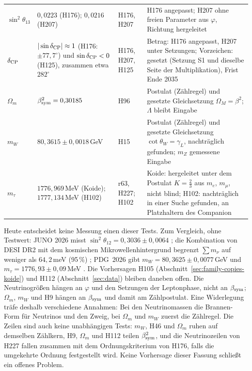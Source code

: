 \begin{center}
\begin{tabular}{@{}p{.17\linewidth}p{.25\linewidth}p{.13\linewidth}p{.35\linewidth}@{}}
\raggedright \(\sin^2\theta_{13}\) & \raggedright \(0{,}0223\) (H176); \(0{,}0216\) (H207) & \raggedright H176, H207 & \raggedright H176 angepasst; H207 ohne freien Parameter aus \(\varphi\), Richtung hergeleitet\tabularnewline
\raggedright \(\delta_{\rm CP}\) & \raggedright \(|\sin\delta_{\rm CP}|\approx1\) (H176: \(\pm77{,}7^\circ\)) und \(\sin\delta_{\rm CP}<0\) (H125), zusammen etwa \(282^\circ\) & \raggedright H176, H207, H125 & \raggedright Betrag: H176 angepasst, H207 unter Setzungen; Vorzeichen: gesetzt (Setzung S1 und dieselbe Seite der Multiplikation), Frist Ende 2035\tabularnewline
\hline
\raggedright \(\Omega_m\) & \raggedright \(\beta_{\rm sym}^2=0{,}30185\) & \raggedright H96 & \raggedright Postulat (Zählregel) und gesetzte Gleichsetzung \(\Omega_M=\beta^2\); \(\Lambda\) bleibt Eingabe\tabularnewline
\raggedright \(m_W\) & \raggedright \(80{,}3615\pm0{,}0018\)\,GeV & \raggedright H15 & \raggedright Postulat (Zählregel) und gesetzte Gleichsetzung \(\cot\theta_W=\gamma_L\), nachträglich gefunden; \(m_Z\) gemessene Eingabe\tabularnewline
\raggedright \(m_\tau\) & \raggedright \(1776{,}969\)\,MeV (Koide); \(1777{,}134\)\,MeV (H102) & \raggedright r63, H227; H102 & \raggedright Koide: hergeleitet unter dem Postulat \(K=\tfrac23\) aus \(m_e\), \(m_\mu\), nicht blind; H102: nachträglich in einer Suche gefunden, an Platzhaltern des Companion\tabularnewline
\hline
\end{tabular}
\end{center}

Heute entscheidet keine Messung einen dieser Tests. Zum Vergleich, ohne Testwert: JUNO 2026 misst \(\sin^2\theta_{12}=0{,}3036\pm0{,}0064\)
\cite{juno2026}; die Kombination von DESI DR2 mit dem kosmischen Mikrowellenhintergrund begrenzt \(\sum m_\nu\) auf weniger als
\(64{,}2\)\,meV (95\,\%) \cite{desi-dr2}; PDG~2026 gibt \(m_W=80{,}3625\pm0{,}0077\)\,GeV und \(m_\tau=1776{,}93\pm0{,}09\)\,MeV \cite{pdg}. Die Vorhersagen H105
(Abschnitt~\ref{sec:family-copies-koide}) und H112 (Abschnitt~\ref{sec:data}) bleiben daneben offen. Die Neutrinogrößen hängen an \(\varphi\) und den
Setzungen der Leptonphase, nicht an \(\beta_{\rm sym}\); \(\Omega_m\), \(m_W\) und H9 hängen an \(\beta_{\rm sym}\) und damit am Zählpostulat. Eine
Widerlegung träfe deshalb verschiedene Annahmen: Bei den Neutrinomassen die Brannen-Form für Neutrinos und den Zweig, bei \(\Omega_m\) und \(m_W\)
zuerst die Zählregel. Die Zeilen sind auch keine unabhängigen Tests: \(m_W\), H46 und \(\Omega_m\) ruhen auf demselben Zählkern, H9, \(\Omega_m\) und H112 teilen
\(\beta_{\rm sym}^2\), und die Neutrinozeilen von H227 fallen zusammen mit dem Ordnungskriterium von H176, falls die umgekehrte Ordnung
festgestellt wird. Keine Vorhersage dieser Fassung schließt ein offenes Problem.


